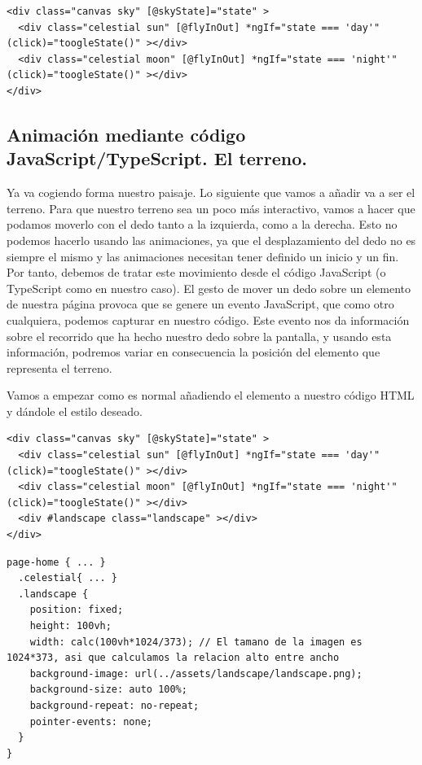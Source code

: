 {\begin{lstlisting}[style=htmlcssjs,frame=tlrb, xleftmargin={0.2cm}]
<div class="canvas sky" [@skyState]="state" >
  <div class="celestial sun" [@flyInOut] *ngIf="state === 'day'" (click)="toogleState()" ></div>
  <div class="celestial moon" [@flyInOut] *ngIf="state === 'night'" (click)="toogleState()" ></div>
</div>
\end{lstlisting}}

\subsection{Animación mediante código JavaScript/TypeScript. El terreno.}


Ya va cogiendo forma nuestro paisaje. Lo siguiente que vamos a añadir va a ser el terreno. Para que nuestro terreno sea un poco más interactivo, vamos a hacer que podamos moverlo con el dedo tanto a la izquierda, como a la derecha. Esto no podemos hacerlo usando las animaciones, ya que el desplazamiento del dedo no es siempre el mismo y las animaciones necesitan tener definido un inicio y un fin. Por tanto, debemos de tratar este movimiento desde el código JavaScript (o TypeScript como en nuestro caso). El gesto de mover un dedo sobre un elemento de nuestra página provoca que se genere un evento JavaScript, que como otro cualquiera, podemos capturar en nuestro código. Este evento nos da información sobre el recorrido que ha hecho nuestro dedo sobre la pantalla, y usando esta información, podremos variar en consecuencia la posición del elemento que representa el terreno.

Vamos a empezar como es normal añadiendo el elemento a nuestro código \gls{HTML} y dándole el estilo deseado.

\noindent
\begin{minipage}[t]{.48\textwidth}
{\begin{lstlisting}[style=htmlcssjs,frame=tlrb, xleftmargin={0.2cm}]
<div class="canvas sky" [@skyState]="state" >
  <div class="celestial sun" [@flyInOut] *ngIf="state === 'day'" (click)="toogleState()" ></div>
  <div class="celestial moon" [@flyInOut] *ngIf="state === 'night'" (click)="toogleState()" ></div>
  <div #landscape class="landscape" ></div>
</div>
\end{lstlisting}}
\end{minipage}\hfill
\noindent
\begin{minipage}[t]{.48\textwidth}
{\begin{lstlisting}[style=htmlcssjs,frame=tlrb, xleftmargin={0.2cm}]
page-home { ... }
  .celestial{ ... }
  .landscape {
    position: fixed;
    height: 100vh;
    width: calc(100vh*1024/373); // El tamano de la imagen es 1024*373, asi que calculamos la relacion alto entre ancho
    background-image: url(../assets/landscape/landscape.png);
    background-size: auto 100%;
    background-repeat: no-repeat;
    pointer-events: none;
  }
}
\end{lstlisting}}
\end{minipage}

